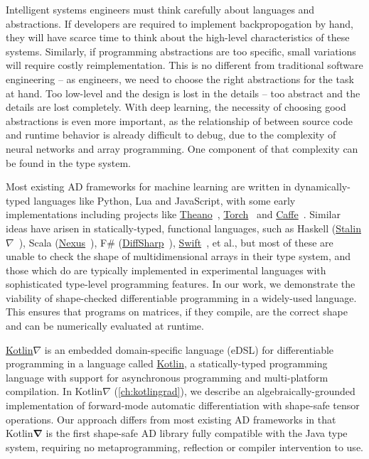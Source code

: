 \documentclass[12pt,initial,twoside,maitrise]{dms}
\numberwithin{equation}{section}
\numberwithin{table}{chapter}
\numberwithin{figure}{chapter}
\begin{document}
Intelligent systems engineers must think carefully about languages and abstractions. If developers are required to implement backpropogation by hand, they will have scarce time to think about the high-level characteristics of these systems. Similarly, if programming abstractions are too specific, small variations will require costly reimplementation. This is no different from traditional software engineering -- as engineers, we need to choose the right abstractions for the task at hand. Too low-level and the design is lost in the details -- too abstract and the details are lost completely. With deep learning, the necessity of choosing good abstractions is even more important, as the relationship of between source code and runtime behavior is already difficult to debug, due to the complexity of neural networks and array programming. One component of that complexity can be found in the type system.

Most existing AD frameworks for machine learning are written in dynamically-typed languages like Python, Lua and JavaScript, with some early implementations including projects like \href{http://deeplearning.net/software/theano/}{Theano}~\citep{bergstra2010theano}, \href{http://torch.ch/}{Torch}~\citep{collobert2002torch} and \href{https://caffe.berkeleyvision.org/}{Caffe}~\citep{jia2014caffe}. Similar ideas have arisen in statically-typed, functional languages, such as Haskell (\href{https://github.com/Functional-AutoDiff/STALINGRAD}{Stalin$\nabla$}~\citep{pearlmutter2008using}), Scala (\href{https://tongfei.me/nexus/}{Nexus}~\citep{chen2017typesafe}), F\# (\href{http://diffsharp.github.io/DiffSharp/}{DiffSharp}~\citep{baydin2015diffsharp}), \href{https://www.tensorflow.org/swift}{Swift}~\citep{lattner2018tensorflow}, et al., but most of these are unable to check the shape of multidimensional arrays in their type system, and those which do are typically implemented in experimental languages with sophisticated type-level programming features. In our work, we demonstrate the viability of shape-checked differentiable programming in a widely-used language. This ensures that programs on matrices, if they compile, are the correct shape and can be numerically evaluated at runtime.

\href{https://github.com/breandan/kotlingrad/}{Kotlin$\nabla$} is an embedded domain-specific language (eDSL) for differentiable programming in a language called \href{https://kotlinlang.org}{Kotlin}, a statically-typed programming language with support for asynchronous programming and multi-platform compilation. In Kotlin$\nabla$ (\autoref{ch:kotlingrad}), we describe an algebraically-grounded implementation of forward-mode automatic differentiation with shape-safe tensor operations. Our approach differs from most existing AD frameworks in that Kotlin$\mathbf{\nabla}$ is the first shape-safe AD library fully compatible with the Java type system, requiring no metaprogramming, reflection or compiler intervention to use.
\end{document}
